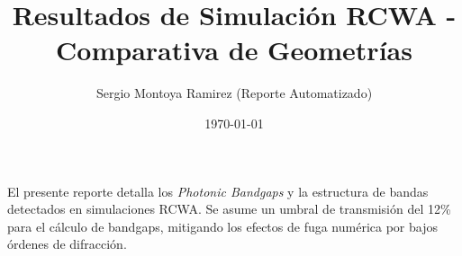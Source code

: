 \documentclass{article}
\begin{document}
\title{Resultados de Simulación RCWA - Comparativa de Geometrías}
\author{Sergio Montoya Ramirez (Reporte Automatizado)}
\date{\today}
\maketitle

El presente reporte detalla los \textit{Photonic Bandgaps} y la estructura de bandas detectados en simulaciones RCWA.
Se asume un umbral de transmisión del 12\% para el cálculo de bandgaps, mitigando los efectos de fuga numérica por bajos órdenes de difracción.
\clearpage




















































\end{document}
